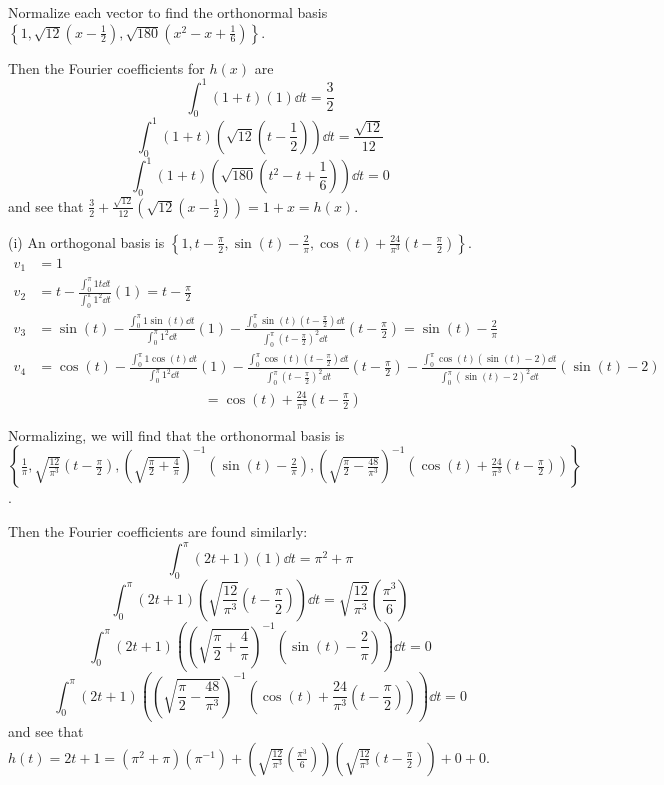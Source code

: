 \documentclass[11pt]{article}
\newcommand{\br}[1]{\left(#1\right)}
\newcommand{\cbr}[1]{\left\{#1\right\}}
\begin{document}
Normalize each vector to find the orthonormal basis $\boxed{\cbr{1, \sqrt{12}\br{x-\frac{1}{2}}, \sqrt{180}\br{x^2-x+\frac{1}{6}}}}$.

Then the Fourier coefficients for $h(x)$ are $$\int_0^1\br{1+t}\br{1}\dd{t} = \frac{3}{2}$$
$$\int_0^1\br{1+t}\br{\sqrt{12}\br{t-\frac{1}{2}}}\dd{t} = \frac{\sqrt{12}}{12}$$
$$\int_0^1\br{1+t}\br{\sqrt{180}\br{t^2-t+\frac{1}{6}}}\dd{t} = 0$$ and see that $\frac{3}{2} + \frac{\sqrt{12}}{12}\br{\sqrt{12}\br{x-\frac{1}{2}}} = 1+x = h(x)$.

(i) An orthogonal basis is $\boxed{\cbr{1, t-\frac{\pi}{2}, \sin(t) - \frac{2}{\pi}, \cos(t) + \frac{24}{\pi^3}\br{t-\frac{\pi}{2}}}}$. \begin{align*}
  v_1 &= 1 \\
  v_2 &= t - \frac{\int_0^{\pi} 1t \dd{t}}{\int_0^{\pi} 1^2 \dd{t}}(1) = t-\frac{\pi}{2} \\
  v_3 &= \sin(t) - \frac{\int_0^\pi 1\sin(t)\dd{t}}{\int_0^\pi 1^2 \dd{t}}(1) - \frac{\int_0^\pi \sin(t)\br{t-\frac{\pi}{2}}\dd{t}}{\int_0^\pi \br{t-\frac{\pi}{2}}^2\dd{t}}\br{t-\frac{\pi}{2}} = \sin(t) - \frac{2}{\pi} \\
  v_4 &= \cos(t) - \frac{\int_0^\pi 1\cos(t)\dd{t}}{\int_0^\pi 1^2\dd{t}}(1) - \frac{\int_0^\pi \cos(t)\br{t-\frac{\pi}{2}}\dd{t}}{\int_0^\pi \br{t-\frac{\pi}{2}}^2\dd{t}}\br{t-\frac{\pi}{2}} - \frac{\int_0^\pi \cos(t)\br{\sin(t)-2}\dd{t}}{\int_0^\pi \br{\sin(t)-2}^2\dd{t}}\br{\sin(t)-2}\\
  &\hspace{5cm}= \cos(t) + \frac{24}{\pi^3}\br{t-\frac{\pi}{2}}
\end{align*}

Normalizing, we will find that the orthonormal basis is \\$\boxed{\cbr{ \frac{1}{\pi}, \sqrt{\frac{12}{\pi^3}}\br{t-\frac{\pi}{2}} , \br{\sqrt{\frac{\pi}{2} + \frac{4}{\pi}}}^{-1}\br{\sin(t)-\frac{2}{\pi}} , \br{\sqrt{\frac{\pi}{2} - \frac{48}{\pi^3}}}^{-1}\br{\cos(t) + \frac{24}{\pi^3}\br{t-\frac{\pi}{2}}}}}$.

Then the Fourier coefficients are found similarly: 
$$\int_0^\pi (2t+1)\br{1}\dd{t} = \pi^2+\pi$$ 
$$\int_0^\pi (2t+1)\br{\sqrt{\frac{12}{\pi^3}}\br{t-\frac{\pi}{2}}}\dd{t} = \sqrt{\frac{12}{\pi^3}}\br{\frac{\pi^3}{6}}$$
$$\int_0^\pi (2t+1)\br{\br{\sqrt{\frac{\pi}{2} + \frac{4}{\pi}}}^{-1}\br{\sin(t)-\frac{2}{\pi}} }\dd{t} = 0$$
$$\int_0^\pi (2t+1)\br{\br{\sqrt{\frac{\pi}{2} - \frac{48}{\pi^3}}}^{-1}\br{\cos(t) + \frac{24}{\pi^3}\br{t-\frac{\pi}{2}}}}\dd{t} = 0$$ and see that $h(t) = 2t+1 = (\pi^2+\pi)(\pi^{-1}) + \br{\sqrt{\frac{12}{\pi^3}}\br{\frac{\pi^3}{6}}}\br{\sqrt{\frac{12}{\pi^3}}\br{t-\frac{\pi}{2}}} + 0 + 0$.
\end{document}
